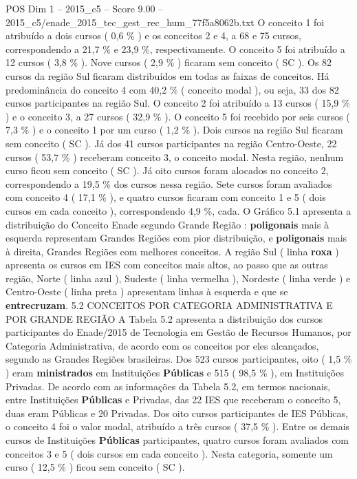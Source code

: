 \begin{textsample}{POS Dim 1 – 2015\_c5 – Score 9.00 – 2015\_c5/enade\_2015\_tec\_gest\_rec\_hum\_77f5a8062b.txt}
O conceito 1 foi atribuído a dois cursos ( 0,6 \% ) e os conceitos 2 e 4, a 68 e 75 cursos, correspondendo a 21,7 \% e 23,9 \%, respectivamente.
O conceito 5 foi atribuído a 12 cursos ( 3,8 \% ).
Nove cursos ( 2,9 \% ) ficaram sem conceito ( SC ).
Os 82 cursos da região Sul ficaram distribuídos em todas as faixas de conceitos.
Há predominância do conceito 4 com 40,2 \% ( conceito modal ), ou seja, 33 dos 82 cursos participantes na região Sul.
O conceito 2 foi atribuído a 13 cursos ( 15,9 \% ) e o conceito 3, a 27 cursos ( 32,9 \% ).
O conceito 5 foi recebido por seis cursos ( 7,3 \% ) e o conceito 1 por um curso ( 1,2 \% ).
Dois cursos na região Sul ficaram sem conceito ( SC ).
Já dos 41 cursos participantes na região Centro-Oeste, 22 cursos ( 53,7 \% ) receberam conceito 3, o conceito modal.
Nesta região, nenhum curso ficou sem conceito ( SC ).
Já oito cursos foram alocados no conceito 2, correspondendo a 19,5 \% dos cursos nessa região.
Sete cursos foram avaliados com conceito 4 ( 17,1 \% ), e quatro cursos ficaram com conceito 1 e 5 ( dois cursos em cada conceito ), correspondendo 4,9 \%, cada.
O Gráfico 5.1 apresenta a distribuição do Conceito Enade segundo Grande Região : \textbf{poligonais} mais à esquerda representam Grandes Regiões com pior distribuição, e \textbf{poligonais} mais à direita, Grandes Regiões com melhores conceitos.
A região Sul ( linha \textbf{roxa} ) apresenta os cursos em IES com conceitos mais altos, ao passo que as outras região, Norte ( linha azul ), Sudeste ( linha vermelha ), Nordeste ( linha verde ) e Centro-Oeste ( linha preta ) apresentam linhas à esquerda e que se \textbf{entrecruzam}. 5.2 CONCEITOS POR CATEGORIA ADMINISTRATIVA E POR GRANDE REGIÃO A Tabela 5.2 apresenta a distribuição dos cursos participantes do Enade/2015 de Tecnologia em Gestão de Recursos Humanos, por Categoria Administrativa, de acordo com os conceitos por eles alcançados, segundo as Grandes Regiões brasileiras.
Dos 523 cursos participantes, oito ( 1,5 \% ) eram \textbf{ministrados} em Instituições \textbf{Públicas} e 515 ( 98,5 \% ), em Instituições Privadas.
De acordo com as informações da Tabela 5.2, em termos nacionais, entre Instituições \textbf{Públicas} e Privadas, das 22 IES que receberam o conceito 5, duas eram Públicas e 20 Privadas.
Dos oito cursos participantes de IES Públicas, o conceito 4 foi o valor modal, atribuído a três cursos ( 37,5 \% ).
Entre os demais cursos de Instituições \textbf{Públicas} participantes, quatro cursos foram avaliados com conceitos 3 e 5 ( dois cursos em cada conceito ).
Nesta categoria, somente um curso ( 12,5 \% ) ficou sem conceito ( SC ).

\end{textsample}
